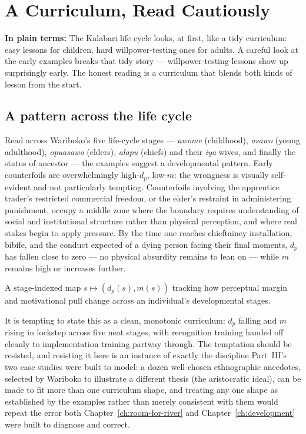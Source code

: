 \chapter{A Curriculum, Read Cautiously}
\label{ch:curriculum}

\begin{plainlanguage}
\textbf{In plain terms:} The Kalabari life cycle looks, at first, like a tidy curriculum: easy lessons for children, hard willpower-testing ones for adults. A careful look at the early examples breaks that tidy story — willpower-testing lessons show up surprisingly early. The honest reading is a curriculum that blends both kinds of lesson from the start.
\end{plainlanguage}

\section{A pattern across the life cycle}

Read across Wariboko's five life-cycle stages --- \emph{awome} (childhood), \emph{asawo} (young adulthood), \emph{opuasawo} (elders), \emph{alapu} (chiefs) and their \emph{iya} wives, and finally the status of ancestor --- the examples suggest a developmental pattern. Early counterfoils are overwhelmingly high-$d_p$, low-$m$: the wrongness is visually self-evident and not particularly tempting. Counterfoils involving the apprentice trader's restricted commercial freedom, or the elder's restraint in administering punishment, occupy a middle zone where the boundary requires understanding of social and institutional structure rather than physical perception, and where real stakes begin to apply pressure. By the time one reaches chieftaincy installation, bibife, and the conduct expected of a dying person facing their final moments, $d_p$ has fallen close to zero --- no physical absurdity remains to lean on --- while $m$ remains high or increases further.

\begin{definition}
A stage-indexed map $s \mapsto (d_p(s), m(s))$ tracking how perceptual margin and motivational pull change across an individual's developmental stages.
\end{definition}

\begin{naivemodel}
It is tempting to state this as a clean, monotonic curriculum: $d_p$ falling and $m$ rising in lockstep across five neat stages, with recognition training handed off cleanly to implementation training partway through. The temptation should be resisted, and resisting it here is an instance of exactly the discipline Part~III's two case studies were built to model: a dozen well-chosen ethnographic anecdotes, selected by Wariboko to illustrate a different thesis (the aristocratic ideal), can be made to fit more than one curriculum shape, and treating any one shape as established by the examples rather than merely consistent with them would repeat the error both Chapter~\ref{ch:room-for-river} and Chapter~\ref{ch:development} were built to diagnose and correct.
\end{naivemodel}

